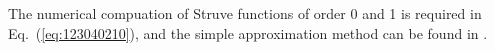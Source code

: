 The numerical compuation of Struve functions of order 0 and 1 is required in Eq.~(\ref{eq:123040210}), and the simple approximation method can be found in \cite{Newman1984ApproximationsBesselStruve, Maurel2007InteractionSurfaceWave, Aarts2016EfficientApproximationStruve}.

